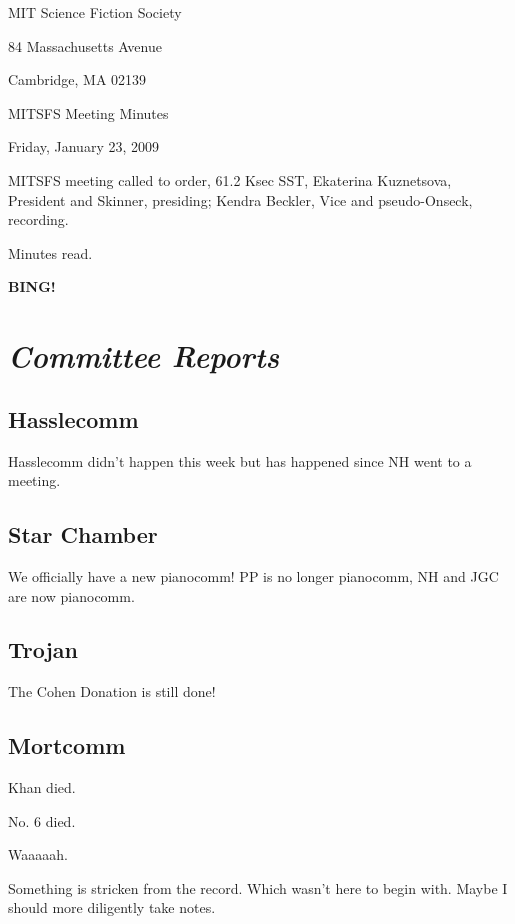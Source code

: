 \documentclass[10pt]{article}
\newcommand{\bing}{{\bf BING!} }
\newcommand{\goto}[1]{\bing \vskip 12pt \section*{{\em{#1}}}}
\begin{document}
\begin{center}

MIT Science Fiction Society

84 Massachusetts Avenue

Cambridge, MA 02139

\vspace{12pt}

MITSFS Meeting Minutes

Friday, January 23, 2009

\end{center}

\vspace{18pt}

\setlength{\parskip}{6pt}

\noindent
MITSFS meeting called to order, 61.2 Ksec SST,
Ekaterina Kuznetsova, President and Skinner, presiding; Kendra Beckler, Vice and pseudo-Onseck, recording.

Minutes read.

\goto{Committee Reports}

\subsection*{Hasslecomm}

Hasslecomm didn't happen this week but has happened since NH went to a meeting.

\subsection*{Star Chamber}

We officially have a new pianocomm!  PP is no longer pianocomm, NH and JGC are now pianocomm.

\subsection*{Trojan}

The Cohen Donation is still done!

\subsection*{Mortcomm}

Khan died.

No. 6 died.

Waaaaah.

Something is stricken from the record.  Which wasn't here to begin with.  Maybe I should more diligently take notes.
\end{document}
